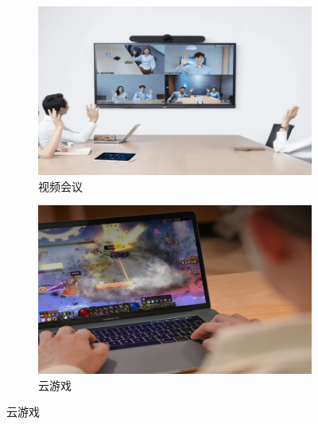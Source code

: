 \begin{figure}[ht]
\centering
\begin{subfigure}[t]{0.48\linewidth} 
  \centering
  \includegraphics[height=0.2\textheight]{figures/applications/meet.png} %
  \caption{视频会议}
\end{subfigure}%
\begin{subfigure}[t]{0.48\linewidth} 
  \centering
  \includegraphics[height=0.2\textheight]{figures/applications/cloudgame.png} %
  \caption{云游戏}
\end{subfigure}


\end{figure}
